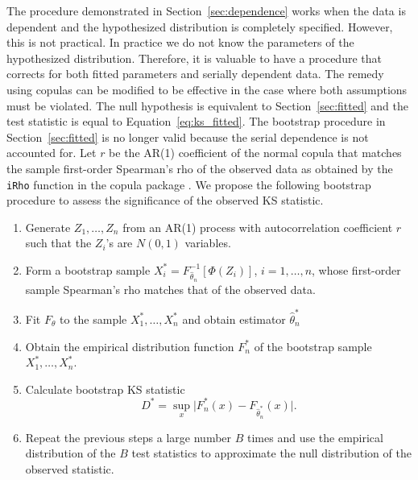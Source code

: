 \documentclass[12pt, letterpaper, titlepage]{article}
\begin{document}
The procedure demonstrated in Section~\ref{sec:dependence} works when the data
is dependent and the hypothesized distribution is completely specified. However,
this is not practical. In practice we do not know the parameters of the
hypothesized distribution. Therefore, it is valuable to have a procedure that
corrects for both fitted parameters and serially dependent data. The remedy
using copulas can be modified to be effective in the case where both assumptions
must be violated. The null hypothesis is equivalent to Section~\ref{sec:fitted}
and the test statistic is equal to Equation~\eqref{eq:ks_fitted}. The bootstrap
procedure in Section~\ref{sec:fitted} is no longer valid because the serial
dependence is not accounted for. Let $r$ be the AR(1) coefficient of the normal
copula that matches the sample first-order Spearman's rho of the observed data
as obtained by the \texttt{iRho} function in the \textsf{copula} package
\citep{Copula}. We propose the following bootstrap procedure to assess the
significance of the observed KS statistic.

\begin{enumerate}
\item
  Generate $Z_1, \ldots, Z_n$ from an AR(1) process with autocorrelation
  coefficient $r$ such that the $Z_i$'s are $N(0, 1)$ variables.
\item
  Form a bootstrap sample $X_i^* = F^{-1}_{\hat\theta_n} [\Phi(Z_i)]$,
  $i = 1, \ldots, n$, whose first-order sample Spearman's rho matches that of
  the observed data.
\item
  Fit $F_\theta$ to the sample $X_1^*, \ldots, X_n^*$ and obtain estimator
  $\hat\theta_n^*$
\item
  Obtain the empirical distribution function $F_n^*$ of the bootstrap sample
  $X_1^*, \ldots, X_n^*$.
\item
  Calculate bootstrap KS statistic
  \[
    D^* = \sup_x \lvert F_n^* (x)- F_{\hat\theta_n^*}(x) \rvert.
  \]
\item
  Repeat the previous steps a large number $B$ times and use the empirical
    distribution of the $B$ test statistics to approximate
    the null distribution of the observed statistic.
\end{enumerate}
\end{document}
